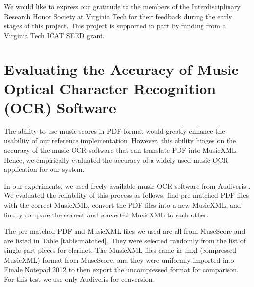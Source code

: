 \documentclass[10pt,preprint]{sigplanconf}
\begin{document}
We would like to express our gratitude to the members of the Interdisciplinary Research Honor Society at Virginia Tech for their feedback during the early stages of this project. This project is supported in part by funding from a Virginia Tech ICAT SEED grant.






\balance
\medskip
%



\pagebreak
\newpage
\appendix

\section{Evaluating the Accuracy of Music Optical Character Recognition (OCR) Software}
\label{sec:ocr}


The ability to use music scores in PDF format would greatly enhance the usability of our reference implementation. However, this ability hinges on the accuracy of the music OCR software that can translate PDF into MusicXML. Hence, we empirically evaluated the accuracy of a widely used music OCR application  for our system.

In our experiments, we used freely available music OCR software from Audiveris \cite{Audiveris}. We evaluated the reliability of this process as follows: find pre-matched PDF files with the correct MusicXML, convert the PDF files into a new MusicXML, and finally compare the correct and converted MusicXML to each other.

The pre-matched PDF and MusicXML files we used are all from MuseScore \cite{MuseScore} and are listed in Table \ref{table:matched}. They were selected randomly from the list of single part pieces for clarinet. The MusicXML files came in .mxl (compressed MusicXML) format from MuseScore, and they were uniformly imported into Finale Notepad 2012 \cite{FinaleNotepad} to then export the uncompressed format for comparison. For this test we use only Audiveris for conversion.
\end{document}
